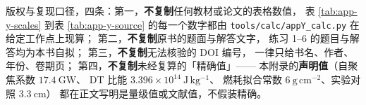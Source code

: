 \enlargethispage{2\baselineskip}
\footnotesize
{} 版权与复现口径，四条：第一，\textbf{不复制}任何教材或论文的表格数值，
表 \ref{tab:app-y-scales} 到表 \ref{tab:app-y-source} 的每一个数字都由
\texttt{tools/\allowbreak{}calc/\allowbreak{}appY\_calc.py} 在给定工作点上现算；
第二，\textbf{不复制}原书的题面与解答文字，
练习 1--6 的题目与解答均为本书自拟；
第三，\textbf{不复制}无法核验的 DOI 编号，
一律只给书名、作者、年份、卷期页；
第四，\textbf{不复制}未经复算的「精确值」——
本附录的\textbf{声明值}（自聚焦系数 $17.4\ \mathrm{GW}$、
DT 比能 $3.396\times10^{14}\ \mathrm{J\,kg^{-1}}$、
燃耗拟合常数 $6\ \mathrm{g\,cm^{-2}}$、实验对照 $3.3\ \mathrm{cm}$）
都在正文写明是量级值或文献值，不假装精确。
\endgroup

